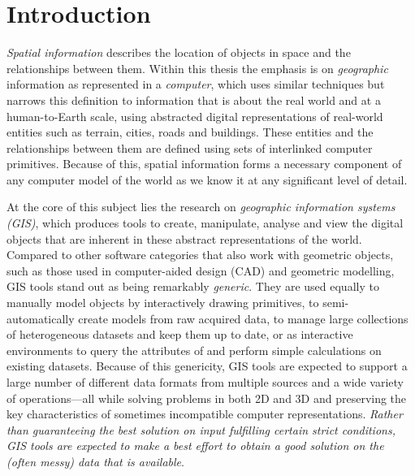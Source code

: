 
\chapter{Introduction}
\label{ch:introduction}


\emph{Spatial information} describes the location of objects in space and the relationships between them.
Within this thesis the emphasis is on \emph{geographic} information as represented in a \emph{computer}, which uses similar techniques but narrows this definition to information that is about the real world and at a human-to-Earth scale, using abstracted digital representations of real-world entities such as terrain, cities, roads and buildings.
These entities and the relationships between them are defined using sets of interlinked computer primitives.
Because of this, spatial information forms a necessary component of any computer model of the world as we know it at any significant level of detail.


At the core of this subject lies the research on \emph{geographic information systems (GIS)}, which produces tools to create, manipulate, analyse and view the digital objects that are inherent in these abstract representations of the world.
Compared to other software categories that also work with geometric objects, such as those used in computer-aided design (CAD) and geometric modelling, GIS tools stand out as being remarkably \emph{generic}.
They are used equally to manually model objects by interactively drawing primitives, to semi-automatically create models from raw acquired data, to manage large collections of heterogeneous datasets and keep them up to date, or as interactive environments to query the attributes of and perform simple calculations on existing datasets.
Because of this genericity, GIS tools are expected to support a large number of different data formats from multiple sources and a wide variety of operations---all while solving problems in both 2D and 3D and preserving the key characteristics of sometimes incompatible computer representations.
\emph{Rather than guaranteeing the best solution on input fulfilling certain strict conditions, GIS tools are  expected to make a best effort to obtain a good solution on the (often messy) data that is available}.


